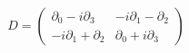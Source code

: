 \begin{equation}
D= \left(
\begin{array}{cc}
\partial_{0} -i \partial_{3} & -i \partial_{1} - \partial_{2}  \\
-i \partial_{1} + \partial_{2}  & \partial_{0} +i \partial_{3}
\end{array}
\right)
\end{equation}

